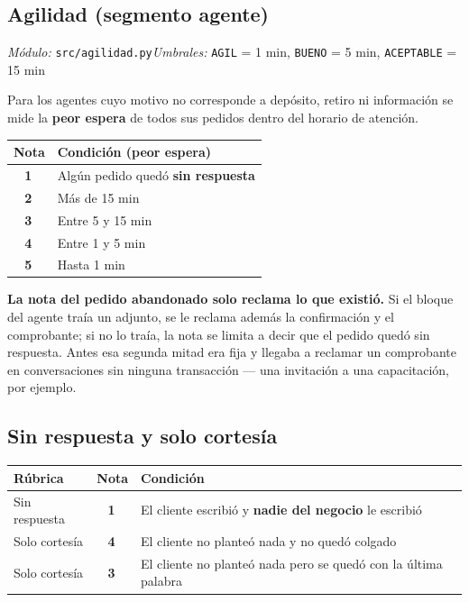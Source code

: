 \documentclass[11pt,a4paper]{article}
\newcommand{\cod}[1]{\texttt{\small #1}}
\newcommand{\est}[1]{\textbf{#1}\,\raisebox{0.5pt}{$\star$}}
\begin{document}
\subsection{Agilidad (segmento agente)}
\emph{Módulo:} \cod{src/agilidad.py}\quad\emph{Umbrales:} \cod{AGIL} = 1 min,
\cod{BUENO} = 5 min, \cod{ACEPTABLE} = 15 min

Para los agentes cuyo motivo no corresponde a depósito, retiro ni información se mide la
\textbf{peor espera} de todos sus pedidos dentro del horario de atención.

\begin{center}
\begin{tabularx}{\textwidth}{@{}cX@{}}
\toprule
\textbf{Nota} & \textbf{Condición (peor espera)} \\
\midrule
\est{1} & Algún pedido quedó \textbf{sin respuesta} \\
\est{2} & Más de 15 min \\
\est{3} & Entre 5 y 15 min \\
\est{4} & Entre 1 y 5 min \\
\est{5} & Hasta 1 min \\
\bottomrule
\end{tabularx}
\end{center}

\begin{nota}
\textbf{La nota del pedido abandonado solo reclama lo que existió.} Si el bloque del agente
traía un adjunto, se le reclama además la confirmación y el comprobante; si no lo traía, la
nota se limita a decir que el pedido quedó sin respuesta. Antes esa segunda mitad era fija y
llegaba a reclamar un comprobante en conversaciones sin ninguna transacción --- una
invitación a una capacitación, por ejemplo.
\end{nota}

\subsection{Sin respuesta y solo cortesía}

\begin{center}
\begin{tabularx}{\textwidth}{@{}lcX@{}}
\toprule
\textbf{Rúbrica} & \textbf{Nota} & \textbf{Condición} \\
\midrule
Sin respuesta  & \est{1} & El cliente escribió y \textbf{nadie del negocio} le escribió \\
Solo cortesía  & \est{4} & El cliente no planteó nada y no quedó colgado \\
Solo cortesía  & \est{3} & El cliente no planteó nada pero se quedó con la última palabra \\
\bottomrule
\end{tabularx}
\end{center}
\end{document}
